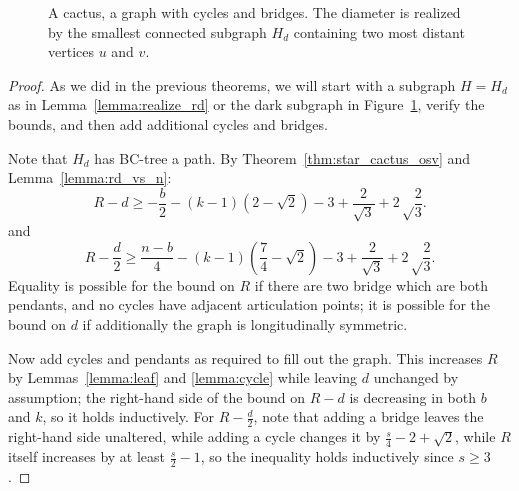 \documentclass{amsart}
\theoremstyle{definition}
\begin{document}
\begin{figure}
\caption{A cactus, a graph with cycles and bridges. The diameter is realized by the smallest connected subgraph $H_d$ containing two most distant vertices $u$ and $v$.}\label{fig:cactus_d}
\end{figure}

\begin{proof}
As we did in the previous theorems, we will start with a subgraph $H=H_d$ as in Lemma~\ref{lemma:realize_rd} or the dark subgraph in Figure~\ref{fig:cactus_d}, verify the bounds, and then add additional cycles and bridges.

Note that $H_d$ has BC-tree a path. By Theorem~\ref{thm:star_cactus_osv} and Lemma~\ref{lemma:rd_vs_n}:
\[R - d \geq -\frac{b}{2} - (k-1)\left(2 - \sqrt 2 \right) - 3 + \frac{2}{\sqrt 3} + 2\sqrt\frac{2}{3}.\]
and
\[R - \frac{d}{2} \geq \frac{n-b}{4} - (k-1)\left(\frac{7}{4} - \sqrt 2 \right) - 3 + \frac{2}{\sqrt 3} + 2\sqrt\frac{2}{3}.\]
Equality is possible for the bound on $R$ if there are two bridge which are both pendants, and no cycles have adjacent articulation points; it is possible for the bound on $d$ if additionally the graph is longitudinally symmetric.

Now add cycles and pendants as required to fill out the graph. This increases $R$ by Lemmas~\ref{lemma:leaf} and \ref{lemma:cycle} while leaving $d$ unchanged by assumption; the right-hand side of the bound on $R-d$ is decreasing in both $b$ and $k$, so it holds inductively. For $R-\frac{d}{2}$, note that adding a bridge leaves the right-hand side unaltered, while adding a cycle changes it by $\frac{s}{4} - 2 + \sqrt 2$, while $R$ itself increases by at least $\frac{s}{2} - 1$, so the inequality holds inductively since $s \geq 3$.
\end{proof}
\end{document}
